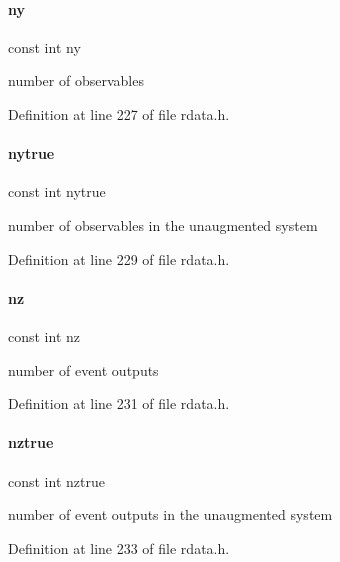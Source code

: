 \paragraph{\texorpdfstring{ny}{ny}}
{\footnotesize\ttfamily const int ny}

number of observables 

Definition at line 227 of file rdata.\+h.

\mbox{\label{classamici_1_1_return_data_a54bcfe56ad0df183516d096adf4e0b26}} 
\paragraph{\texorpdfstring{nytrue}{nytrue}}
{\footnotesize\ttfamily const int nytrue}

number of observables in the unaugmented system 

Definition at line 229 of file rdata.\+h.

\mbox{\label{classamici_1_1_return_data_aa406c307f97060d218bc1fe594dfd08f}} 
\paragraph{\texorpdfstring{nz}{nz}}
{\footnotesize\ttfamily const int nz}

number of event outputs 

Definition at line 231 of file rdata.\+h.

\mbox{\label{classamici_1_1_return_data_a9a451378ba5572ef7a3fd4dd89e1c227}} 
\paragraph{\texorpdfstring{nztrue}{nztrue}}
{\footnotesize\ttfamily const int nztrue}

number of event outputs in the unaugmented system 

Definition at line 233 of file rdata.\+h.

